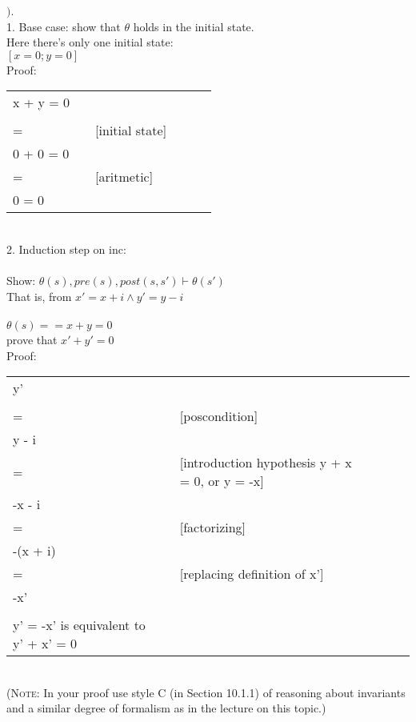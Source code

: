 \documentclass{article}
\begin{document}
$)$.
\\
1. Base case: show that $\theta$ holds in the initial state. \\
Here there's only one initial state: \\
$[x = 0;y = 0 ]$ \\ 
Proof: \\
\begin{tabular}{l ll lll}
     x + y = 0 \\ &    &  \\
     = &   & [initial state] \\
     0 + 0 = 0 & & \\
     = &   & [aritmetic] \\
     0 = 0  \\
\end{tabular} \\
2. Induction step on inc: \\
\\
Show: $\theta (s), pre(s), post(s, s') \vdash \theta(s')$ \\
That is, from $x' = x + i \wedge y' = y - i$ \\
\\
$ \theta (s) == x + y = 0 $ \\
prove that $ x' + y' = 0 $ \\
Proof: \\
\begin{tabular}{l ll lll}
     y' \\ &    &  \\
     = &   & [poscondition] \\
     y - i & & \\
     = &   & [introduction hypothesis y + x = 0, or y = -x] \\
     -x - i \\
     = & & [factorizing] \\ 
     -(x + i) \\
     = & & [replacing definition of x'] \\
     -x' \\
     \\
    y' = -x' is equivalent to y' + x' = 0 \\
\end{tabular} \\
\noindent (\textsc{Note:} In your proof use style C (in Section 10.1.1) of reasoning about invariants and a similar degree of formalism as in the lecture on this topic.)

\vspace{12pt}
\end{document}
